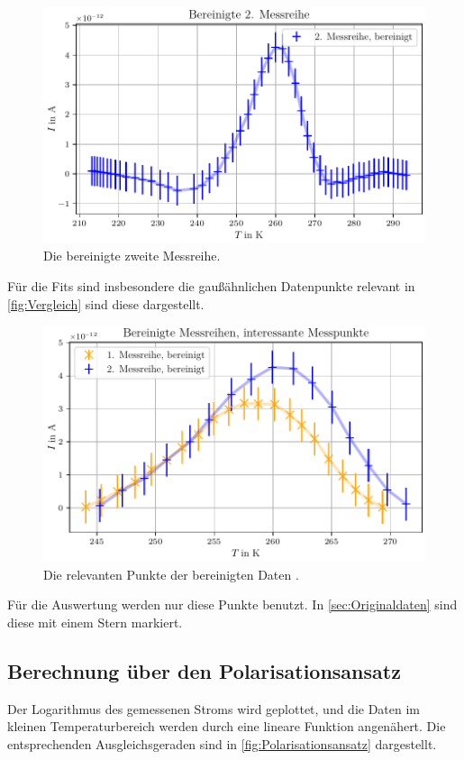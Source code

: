 \begin{figure}[H]
    \centering
    \includegraphics[width=\textwidth]{plots/E_messreihe2_bereinigt.pdf}
    \caption{Die bereinigte zweite Messreihe.}
    \label{fig:Bereinigt2}
\end{figure}

Für die Fits sind insbesondere die gaußähnlichen Datenpunkte relevant in \autoref{fig:Vergleich} sind diese dargestellt.

\begin{figure}[H]
    \centering
    \includegraphics[width=\textwidth]{plots/F_messreihen_bereinigt_relevantepunkte.pdf}
    \caption{Die relevanten Punkte der bereinigten Daten .}
    \label{fig:Vergleich}
\end{figure}

Für die Auswertung werden nur diese Punkte benutzt. In \autoref{sec:Originaldaten} sind diese mit einem Stern markiert.

\subsection{Berechnung über den Polarisationsansatz}
Der Logarithmus des gemessenen Stroms wird geplottet, und die Daten im kleinen Temperaturbereich werden
durch eine lineare Funktion angenähert. Die entsprechenden Ausgleichsgeraden sind in \autoref{fig:Polarisationsansatz} dargestellt.

